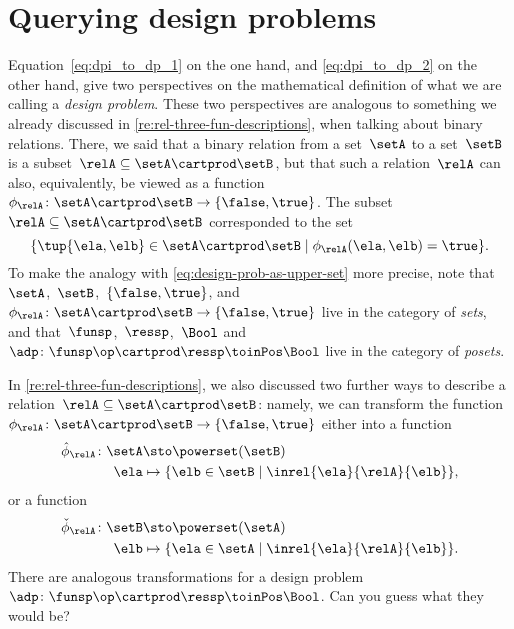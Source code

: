 

\section{Querying design problems}
\label{sec:dp-querying}



Equation~\cref{eq:dpi_to_dp_1} on the one hand, and \cref{eq:dpi_to_dp_2} on the other hand, give two perspectives on the mathematical definition of what we are calling a \emph{design problem}.
These two perspectives are analogous to something we already discussed in \cref{re:rel-three-fun-descriptions}, when talking about binary relations.
There, we said that a binary relation from a set~$\setA$ to a set~$\setB$ is a subset~$\relA \subseteq \setA \cartprod \setB$,
but that such a relation~$\relA$ can also, equivalently, be viewed as a function~$\phi_{\relA}\colon \setA \cartprod\setB \to \{ \false, \true \}$.
The subset~$\relA \subseteq \setA \cartprod \setB$ corresponded to the set
\begin{equation}
    \{ \tup{\ela, \elb} \in \setA \cartprod \setB \mid \phi_{\relA}(\ela, \elb) = \true \}.
\end{equation}
%
To make the analogy with \cref{eq:design-prob-as-upper-set} more precise, note that~$\setA$,~$\setB$,~$\{ \false, \true \}$, and~$\phi_{\relA}\colon \setA \cartprod\setB \to \{ \false, \true \}$ live in the category of \emph{sets}, and that~$\funsp$,~$\ressp$,~$\Bool$ and~$\adp\colon \funsp\op \cartprod \ressp\toinPos \Bool$ live in the category of \emph{posets}.

In \cref{re:rel-three-fun-descriptions}, we also discussed two further ways to describe a relation~$\relA \subseteq \setA \cartprod \setB$: namely, we can transform the function~$\phi_{\relA}\colon \setA \cartprod\setB \to \{ \false, \true \}$ either into a function
\begin{equation}
    \label{eq:curried-relation-again}
    \begin{aligned}
        \hat \phi_{\relA} \colon \setA &\sto \powerset (\setB)\\
        \ela &\mapsto \{ \elb \in \setB \mid \inrel{\ela}{\relA}{\elb} \},
    \end{aligned}
\end{equation}
or a function
\begin{equation}
    \label{eq:co-curried-relation-again}
    \begin{aligned}
        \check \phi_{\relA} \colon \setB &\sto \powerset (\setA)\\
        \elb &\mapsto \{ \ela \in \setA \mid \inrel{\ela}{\relA}{\elb}\}.
    \end{aligned}
\end{equation}
%
There are analogous transformations for a design problem~$\adp\colon \funsp\op \cartprod \ressp\toinPos \Bool$.
Can you guess what they would be?

